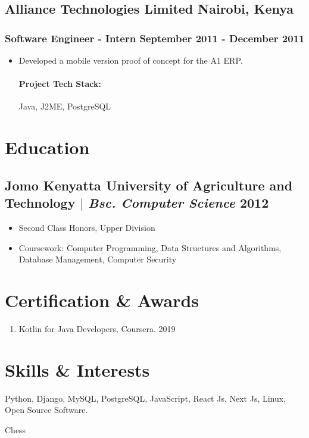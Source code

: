 \documentclass[11pt]{article} %
\begin{document}
\subsection{Alliance Technologies Limited \hfill Nairobi, Kenya}
\subsubsection{Software Engineer - Intern \hfill  September 2011 - December 2011}
\begin{itemize}
    \item Developed a mobile version proof of concept for the A1 ERP. 
    \paragraph{Project Tech Stack:} Java, J2ME, PostgreSQL
\end{itemize}

\section{Education}
\subsection{Jomo Kenyatta University of Agriculture and Technology $|$ {\normalfont\itshape Bsc. Computer Science} \hfill 2012}
\begin{itemize}
    \item Second Class Honors, Upper Division
    \item Coursework: Computer Programming, Data Structures and Algorithms, Database Management, Computer Security
\end{itemize}


\section{Certification \& Awards}
\begin{enumerate}[label=\null, left=0pt..0pt, itemsep=0pt]
        \item Kotlin for Java Developers, Coursera. \hfill 2019
\end{enumerate}

\section{Skills \& Interests}
\begin{description}[itemsep=0pt]
        \item[Technical] Python, Django, MySQL, PostgreSQL, JavaScript, React Js, Next Js, Linux, Open Source Software. 
        \item[Interests] Chess
\end{description}
\end{document}

